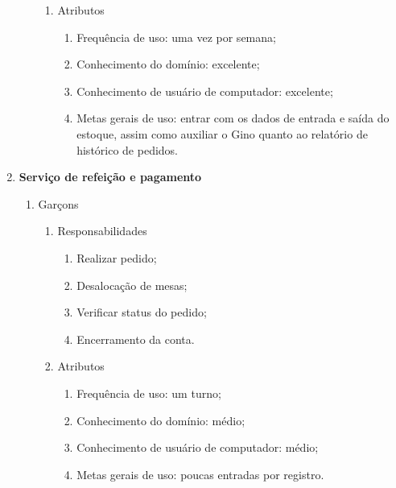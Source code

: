 \begin{enumerate}
\begin{enumerate}
\begin{enumerate}
        \item Atributos

          \begin{enumerate}
              \item Frequência de uso: uma vez por semana;
              \item Conhecimento do domínio: excelente;
              \item Conhecimento de usuário de computador: excelente;
              \item Metas gerais de uso: entrar com os dados de entrada e saída do estoque, assim como auxiliar o Gino quanto ao relatório de histórico de pedidos.

          \end{enumerate}
      \end{enumerate}

    \end{enumerate}

    \item \textbf{Serviço de refeição e pagamento}

    \begin{enumerate}

      \item Garçons

      \begin{enumerate}
        \item Responsabilidades

          \begin{enumerate}
              \item Realizar pedido;
              \item Desalocação de mesas;
              \item Verificar status do pedido;
              \item Encerramento da conta.
          \end{enumerate}

        \item Atributos

          \begin{enumerate}
              \item Frequência de uso: um turno;
              \item Conhecimento do domínio: médio;
              \item Conhecimento de usuário de computador: médio;
              \item Metas gerais de uso: poucas entradas por registro.
          \end{enumerate}
      \end{enumerate}

    \end{enumerate}

\end{enumerate}

